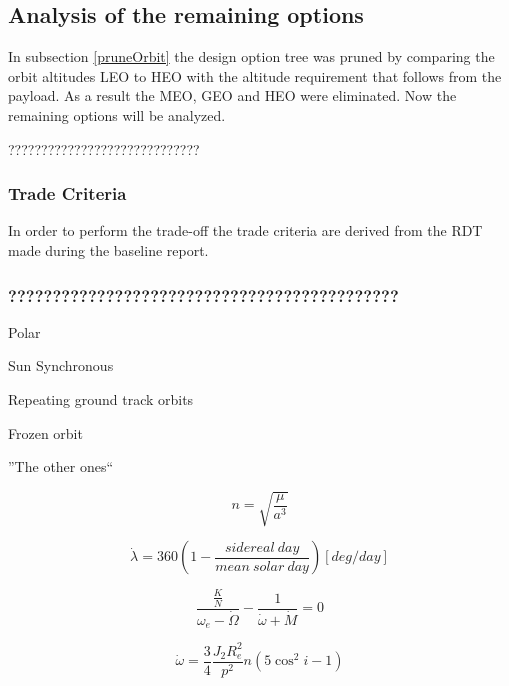 \documentclass{article}
\begin{document}
\subsection{Analysis of the remaining options}
\label{OrbAnal}

In subsection \ref{pruneOrbit} the design option tree was pruned by comparing the orbit altitudes \ac{LEO} to \ac{HEO} with the altitude requirement that follows from the payload. As a result the \acs{MEO}, \acs{GEO} and \acs{HEO} were eliminated. Now the remaining options will be analyzed.

?????????????????????????????

\subsubsection{Trade Criteria}

In order to perform the trade-off the trade criteria are derived from the \ac{RDT} made during the baseline report. 

\subsubsection{????????????????????????????????????????????}

Polar

Sun Synchronous

Repeating ground track orbits

Frozen orbit

''The other ones``


\begin{equation}
n = \sqrt {\frac{\mu }
{{a^3 }}} 
\label{meanMotion}
\end{equation}

\begin{equation}
\dot \lambda  = 360\left( {1 - \frac{{sidereal\ day}}
{{mean\ solar\ day}}} \right) [deg/day]
\label{lambdaDot}
\end{equation}


\begin{equation}
\frac{{\frac{K}
{N}}}
{{\omega _e  - \dot \Omega }} - \frac{1}
{{\dot \omega  + \dot M}} = 0
\label{repeat}
\end{equation}

\begin{equation}
\dot \omega  = \frac{3}
{4}\frac{{J_2 R_e^2 }}
{{p^2 }}n\left( {5\cos ^2 i - 1} \right)
\label{Argument}
\end{equation}
\end{document}
